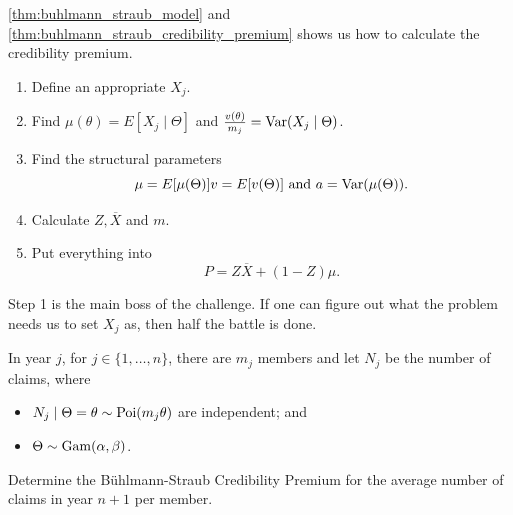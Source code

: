 \documentclass[notoc,notitlepage]{tufte-book}
\begin{document}
\begin{procedure}\label{procedeure:finding_the_buhlmann_straub_credibility_premium}
  \cref{thm:buhlmann_straub_model} and
  \cref{thm:buhlmann_straub_credibility_premium}
  shows us how to calculate the credibility premium.
  \begin{enumerate}
    \item Define an appropriate $X_j$.
    \item Find $\mu(\theta) = E[X_j \mid \Theta]$
      and $\frac{v(\theta)}{m_j} = \operatorname{Var}(X_j \mid \Theta)$.
    \item Find the structural parameters
      \begin{equation*}
        \mu = E[\mu(\Theta)]
        v = E[v(\Theta)] \text{ and }
        a = \operatorname{Var}(\mu(\Theta)).
      \end{equation*}
    \item Calculate $Z, \overline{X}$ and $m$.
    \item Put everything into
      \begin{equation*}
        P = Z \overline{X} + (1 - Z) \mu.
      \end{equation*}
  \end{enumerate}
  Step 1 is the main boss of the challenge.
  If one can figure out what the problem needs us to set $X_j$ as,
  then half the battle is done.
\end{procedure}

\begin{eg}
  In year $j$, for $j \in \{1, \ldots, n \}$, there are $m_j$ members
  and let $N_j$ be the number of claims, where
  \begin{itemize}
    \item $N_j \mid \Theta = \theta \sim \operatorname{Poi}(m_j \theta)$ are independent; and
    \item $\Theta \sim \operatorname{Gam}(\alpha, \beta)$.
  \end{itemize}
  Determine the B\"{u}hlmann-Straub Credibility Premium
  for the average number of claims in year $n + 1$ per member.
\end{eg}
\end{document}
